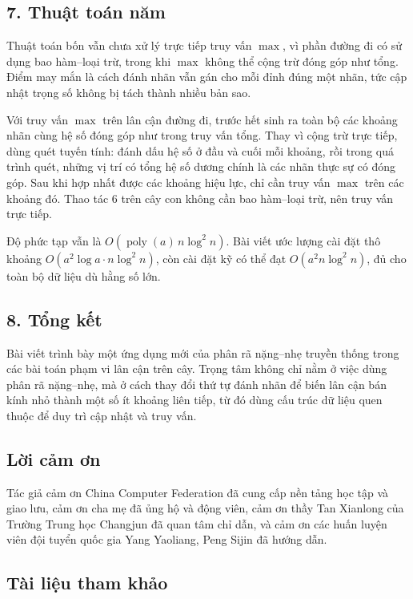 \documentclass[11pt]{article}
\begin{document}
\subsection*{7. Thuật toán năm}

Thuật toán bốn vẫn chưa xử lý trực tiếp truy vấn \(\max\), vì phần đường đi có
sử dụng bao hàm--loại trừ, trong khi \(\max\) không thể cộng trừ đóng góp như
tổng. Điểm may mắn là cách đánh nhãn vẫn gán cho mỗi đỉnh đúng một nhãn, tức
cập nhật trọng số không bị tách thành nhiều bản sao.

Với truy vấn \(\max\) trên lân cận đường đi, trước hết sinh ra toàn bộ các
khoảng nhãn cùng hệ số đóng góp như trong truy vấn tổng. Thay vì cộng trừ trực
tiếp, dùng quét tuyến tính: đánh dấu hệ số ở đầu và cuối mỗi khoảng, rồi trong
quá trình quét, những vị trí có tổng hệ số dương chính là các nhãn thực sự có
đóng góp. Sau khi hợp nhất được các khoảng hiệu lực, chỉ cần truy vấn \(\max\)
trên các khoảng đó. Thao tác 6 trên cây con không cần bao hàm--loại trừ, nên
truy vấn trực tiếp.

Độ phức tạp vẫn là \(O(\operatorname{poly}(a)\,n\log^2 n)\). Bài viết ước lượng
cài đặt thô khoảng \(O(a^2\log a\cdot n\log^2 n)\), còn cài đặt kỹ có thể đạt
\(O(a^2n\log^2 n)\), đủ cho toàn bộ dữ liệu dù hằng số lớn.

\subsection*{8. Tổng kết}

Bài viết trình bày một ứng dụng mới của phân rã nặng--nhẹ truyền thống trong
các bài toán phạm vi lân cận trên cây. Trọng tâm không chỉ nằm ở việc dùng
phân rã nặng--nhẹ, mà ở cách thay đổi thứ tự đánh nhãn để biến lân cận bán kính
nhỏ thành một số ít khoảng liên tiếp, từ đó dùng cấu trúc dữ liệu quen thuộc
để duy trì cập nhật và truy vấn.

\subsection*{Lời cảm ơn}

Tác giả cảm ơn China Computer Federation đã cung cấp nền tảng học tập và giao
lưu, cảm ơn cha mẹ đã ủng hộ và động viên, cảm ơn thầy Tan Xianlong của Trường
Trung học Changjun đã quan tâm chỉ dẫn, và cảm ơn các huấn luyện viên đội tuyển
quốc gia Yang Yaoliang, Peng Sijin đã hướng dẫn.

\subsection*{Tài liệu tham khảo}
\end{document}

